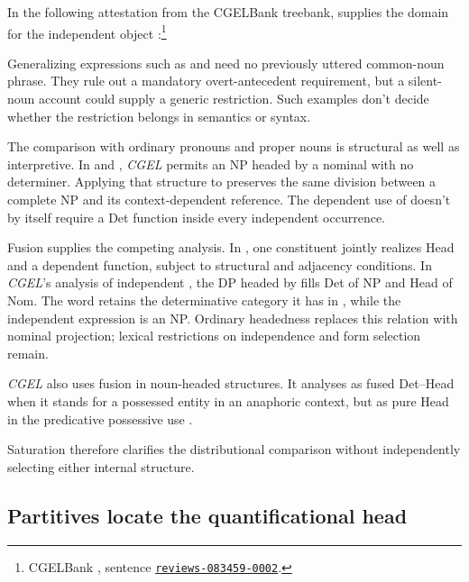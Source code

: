 \documentclass[12pt]{article}
\begin{document}
In the following attestation from the CGELBank treebank,  supplies the domain for the independent object :\footnote{CGELBank \citep{reynolds2023unified}, sentence \href{https://github.com/nert-nlp/cgel/blob/d0a2c2d8c522b23d5aa879fc9cb94948f4285b2c/datasets/ewt.cgel\#L651-L654}{\nolinkurl{reviews-083459-0002}}.}
\ea\label{ex:attested-both}
\z

Generalizing expressions such as  and  need no previously uttered common-noun phrase. They rule out a mandatory overt-antecedent requirement, but a silent-noun account could supply a generic restriction. Such examples don't decide whether the restriction belongs in semantics or syntax.

The comparison with ordinary pronouns and proper nouns is structural as well as interpretive. In  and , \textit{CGEL} permits an NP headed by a nominal with no determiner. Applying that structure to  preserves the same division between a complete NP and its context-dependent reference. The dependent use of  doesn't by itself require a Det function inside every independent occurrence.

Fusion supplies the competing analysis. In \textcite{Payne2007}, one constituent jointly realizes Head and a dependent function, subject to structural and adjacency conditions. In \textit{CGEL}'s analysis of independent , the DP headed by  fills Det of NP and Head of Nom. The word retains the determinative category it has in , while the independent expression is an NP. Ordinary headedness replaces this relation with nominal projection; lexical restrictions on independence and form selection remain.

\textit{CGEL} also uses fusion in noun-headed structures. It analyses  as fused Det--Head when it stands for a possessed entity in an anaphoric context, but as pure Head in the predicative possessive use  \citep[410--411]{huddleston2002}.

Saturation therefore clarifies the distributional comparison without independently selecting either internal structure.

\subsection{Partitives locate the quantificational head}
\end{document}

